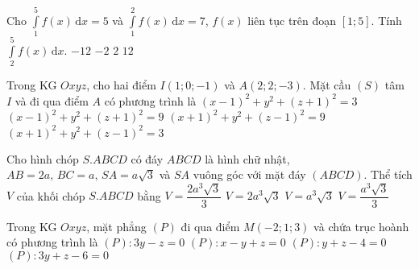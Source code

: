 \begin{ex}%
	Cho $\displaystyle\int\limits_{1}^5 f(x)\mathrm{\,d}x=5$ và $\displaystyle\int\limits_{1}^2 f(x)\mathrm{\,d}x=7$, $f(x)$ liên tục trên đoạn $[1;5]$. Tính $\displaystyle\int\limits_{2}^5 f(x)\mathrm{\,d}x$.
	\choice 
	{$-12$}
	{$-2$}
	{\True $2$}
	{$12$}
\end{ex} 

\begin{ex}%
	Trong KG $Oxyz$, cho hai điểm $I(1;0;-1)$ và $A(2;2;-3)$. Mặt cầu $(S)$ tâm $I$ và đi qua điểm $A$ có phương trình là
	\choice 
	{$(x-1)^2+y^2+(z+1)^2=3$}
	{\True $(x-1)^2+y^2+(z+1)^2=9$} 
	{$(x+1)^2+y^2+(z-1)^2=9$}
	{$(x+1)^2+y^2+(z-1)^2=3$}
\end{ex}

\begin{ex}%
	Cho hình chóp $S.ABCD$ có đáy $ABCD$ là hình chữ nhật, $AB=2a,\,BC=a,\,SA=a\sqrt{3}$ và $SA$ vuông góc với mặt đáy $(ABCD)$. Thể tích $V$ của khối chóp $S.ABCD$ bằng
	\choice 
	{\True $V=\dfrac{2a^3\sqrt{3}}{3}$}
	{$V=2a^3\sqrt{3}$}
	{$V=a^3\sqrt{3}$}
	{$V=\dfrac{a^3\sqrt{3}}{3}$}
\end{ex} 

\begin{ex}%
	Trong KG $Oxyz$, mặt phẳng $(P)$ đi qua điểm $M(-2; 1; 3)$ và chứa trục hoành có phương trình là
	\choice 
	{\True $(P)\colon 3y-z=0$}
	{$(P)\colon x-y+z=0$}
	{$(P)\colon y+z-4=0$}
	{$(P)\colon 3y+z-6=0$}
\end{ex} 

